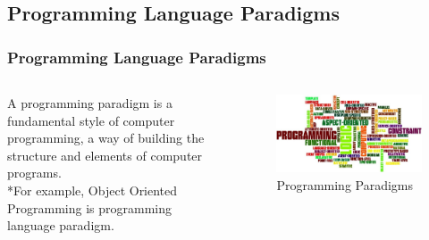 \documentclass[hideothersubsections, t, aspectratio=1610]{beamer}
\begin{document}
\subsection{Programming Language Paradigms}
\begin{frame}
\frametitle{Programming Language Paradigms}
  \begin{columns}[T]
    \begin{column}{.4\textwidth}
     \begin{block}{}
A programming paradigm is a fundamental style of computer programming, a way of building the structure and elements of computer programs.
\\*For example, Object Oriented Programming is programming language paradigm.
    \end{block}
    \end{column}
    \begin{column}{.6\textwidth}
    \begin{block}{}
\begin{figure}
    \includegraphics[width=1\textwidth]{programminglanguageparadigms.jpg} 
    \caption{Programming Paradigms}
 \end{figure}   
    \end{block}
    \end{column}
  \end{columns}
\end{frame}
\end{document}

